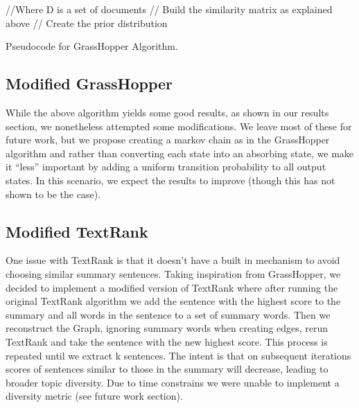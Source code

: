 \documentclass[10pt]{article}
\begin{document}
\begin{algorithm}
  \begin{algorithmic}
     //Where D is a set of documents
     // Build the similarity matrix as explained above
     // Create the prior distribution
    \EndWhile{}
    \EndProcedure{}
  \end{algorithmic}
  \caption{Pseudocode for GrassHopper Algorithm.}
\end{algorithm}


\subsection{Modified GrassHopper}
While the above algorithm yields some good results, as shown in our results section, we nonetheless attempted some modifications. We leave most of these for future work, but we propose creating a markov chain as in the GrassHopper algorithm and rather than converting each state into an absorbing state, we make it ``less'' important by adding a uniform transition probability to all output states. In this scenario, we expect the results to improve (though this has not shown to be the case).

\subsection{Modified TextRank}
One issue with TextRank is that it doesn't have a built in mechanism to avoid choosing similar summary sentences. Taking inspiration from GrassHopper, we decided to implement a modified version of TextRank where after running the original TextRank algorithm we add the sentence with the highest score to the summary and all words in the sentence to a set of summary words. Then we reconstruct the Graph, ignoring summary words when creating edges, rerun TextRank and take the sentence with the new highest score. This process is repeated until we extract k sentences. The intent is that on subsequent iterations scores of sentences similar to those in the summary will decrease, leading to broader topic diversity. Due to time constrains we were unable to implement a diversity metric (see future work section).
\end{document}
